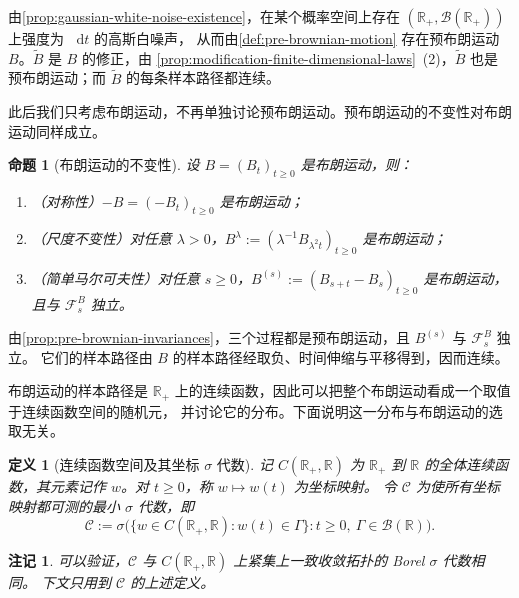 \documentclass[UTF8,11pt,a4paper,oneside,fontset=fandol]{ctexrep}
\makeatletter
\numberwithin{equation}{section}
\theoremstyle{zhthm}
\newtheorem{proposition}[theorem]{命题}
\newtheorem{definition}[theorem]{定义}
\newtheorem{remark}[theorem]{注记}
\renewenvironment{proof}[1][\proofname]{\par
  \pushQED{\qed}%
  \normalfont\topsep6\p@\@plus6\p@\relax
  \trivlist
  \item[\hskip\labelsep\bfseries#1\hspace{0.5em}]\ignorespaces
}{%
  \popQED\endtrivlist\@endpefalse
}
\renewcommand{\proofname}{证明}
\newcommand{\R}{\mathbb{R}}
\newcommand{\B}{\mathcal{B}}
\newcommand{\F}{\mathcal{F}}
\newcommand{\dd}{\mathop{}\!\mathrm{d}}
\makeatother
\begin{document}
\begin{proof}
由\cref{prop:gaussian-white-noise-existence}，在某个概率空间上存在 $(\R_+,\B(\R_+))$ 上强度为 $\dd t$ 的高斯白噪声，
从而由\cref{def:pre-brownian-motion} 存在预布朗运动 $B$。$\widetilde B$ 是 $B$ 的修正，由%
\cref{prop:modification-finite-dimensional-laws}~(2)，$\widetilde B$ 也是预布朗运动；而 $\widetilde B$ 的每条样本路径都连续。
\end{proof}

此后我们只考虑布朗运动，不再单独讨论预布朗运动。预布朗运动的不变性对布朗运动同样成立。

\begin{proposition}[布朗运动的不变性]
\label{prop:brownian-invariances}
设 $B=(B_t)_{t\ge0}$ 是布朗运动，则：
\begin{enumerate}
  \item （对称性）$-B=(-B_t)_{t\ge0}$ 是布朗运动；
  \item （尺度不变性）对任意 $\lambda>0$，$B^\lambda:=(\lambda^{-1}B_{\lambda^2t})_{t\ge0}$ 是布朗运动；
  \item （简单马尔可夫性）对任意 $s\ge0$，$B^{(s)}:=(B_{s+t}-B_s)_{t\ge0}$ 是布朗运动，且与 $\F_s^B$ 独立。
\end{enumerate}
\end{proposition}

\begin{proof}
由\cref{prop:pre-brownian-invariances}，三个过程都是预布朗运动，且 $B^{(s)}$ 与 $\F_s^B$ 独立。
它们的样本路径由 $B$ 的样本路径经取负、时间伸缩与平移得到，因而连续。
\end{proof}

布朗运动的样本路径是 $\R_+$ 上的连续函数，因此可以把整个布朗运动看成一个取值于连续函数空间的随机元，
并讨论它的分布。下面说明这一分布与布朗运动的选取无关。

\begin{definition}[连续函数空间及其坐标 $\sigma$ 代数]
\label{def:continuous-path-space}
记 $C(\R_+,\R)$ 为 $\R_+$ 到 $\R$ 的全体连续函数，其元素记作 $w$。对 $t\ge0$，称 $w\mapsto w(t)$ 为坐标映射。
令 $\mathscr C$ 为使所有坐标映射都可测的最小 $\sigma$ 代数，即
\[
  \mathscr C:=\sigma\bigl(\{w\in C(\R_+,\R):w(t)\in\Gamma\}:t\ge0,\ \Gamma\in\B(\R)\bigr).
\]
\end{definition}

\begin{remark}
\label{rem:coordinate-sigma-borel}
可以验证，$\mathscr C$ 与 $C(\R_+,\R)$ 上紧集上一致收敛拓扑的 Borel $\sigma$ 代数相同\cite[\S2.2]{LeGall2016}。
下文只用到 $\mathscr C$ 的上述定义。
\end{remark}
\end{document}
